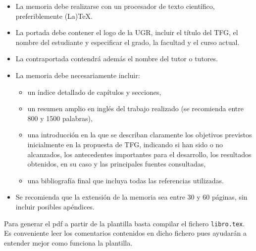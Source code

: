 


































\begin{itemize}
  \item La  memoria  debe  realizarse  con  un  procesador  de  texto  científico,  preferiblemente (La)TeX.
  \item La portada  debe contener  el  logo  de  la UGR,  incluir  el  título del TFG, el nombre del estudiante y especificar el grado, la facultad y el curso actual.
  \item La contraportada contendrá además el nombre del tutor o tutores.
  \item La memoria debe necesariamente incluir:
    \begin{itemize}
      \item un índice detallado de capítulos y secciones,
      \item un resumen amplio en inglés del trabajo realizado (se recomienda entre 800 y 1500 palabras),
      \item una introducción en la que se describan claramente los objetivos previstos inicialmente en la propuesta de TFG, indicando si han sido o no alcanzados, los antecedentes importantes para el desarrollo, los resultados obtenidos, en su caso y las principales fuentes consultadas,
      \item una bibliografía final que incluya todas las referencias utilizadas.
    \end{itemize}
  \item Se recomienda que la extensión de la memoria sea entre 30 y 60 páginas, sin incluir posibles apéndices.
\end{itemize}

Para generar el pdf a partir de la plantilla basta compilar el fichero \texttt{libro.tex}. Es conveniente leer los comentarios contenidos en dicho fichero pues ayudarán a entender mejor como funciona la plantilla. 

